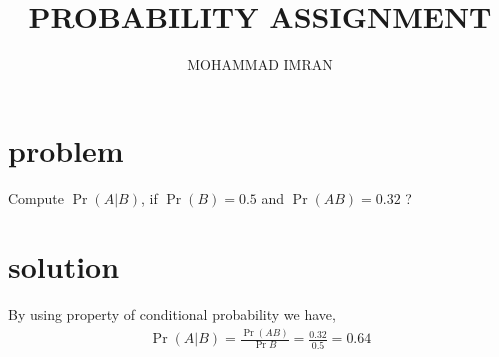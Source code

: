 \documentclass[journal,12pt,twocolumn]{article}
\title{PROBABILITY ASSIGNMENT}
\author{MOHAMMAD IMRAN}
\providecommand{\pr}[1]{\ensuremath{\Pr\left(#1\right)}}
\begin{document}
\maketitle
\bigskip

\section{problem }

Compute $\pr{A|B}$, if $\pr{B}=0.5$ and $\pr{AB}=0.32$ ?

\section{solution }

By using property of conditional probability we have,
\begin{align}
\pr{A|B}=\frac{\pr{AB}}{\Pr{B}}=\frac{0.32}{0.5}=0.64
\end{align}
 
\end{document}
